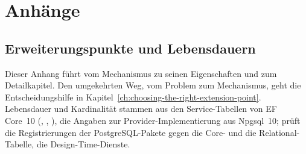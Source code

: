 \part{Anhänge}\label{part:appendices}

\appendix

\chapter{Erweiterungspunkte und Lebensdauern}\label{app:A}

Dieser Anhang führt vom Mechanismus zu seinen Eigenschaften und zum Detailkapitel. Den
umgekehrten Weg, vom Problem zum Mechanismus, geht die Entscheidungshilfe in
Kapitel~\ref{ch:choosing-the-right-extension-point}. Lebensdauer und Kardinalität stammen
aus den Service-Tabellen von EF Core~10
(,
,
),
die Angaben zur Provider-Implementierung aus Npgsql~10;
 prüft die Registrierungen der
PostgreSQL-Pakete gegen die Core- und die Relational-Tabelle,
 die Design-Time-Dienste.

